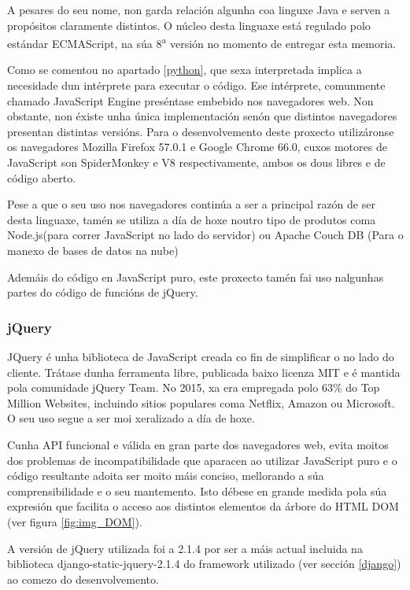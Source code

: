 A pesares do seu nome, non garda relación algunha coa linguxe Java e serven a propósitos claramente distintos. O núcleo desta linguaxe está regulado polo estándar ECMAScript\textregistered, na súa 8\textsuperscript{a} versión\cite{ecma} no momento de entregar esta memoria. 

Como se comentou no apartado \ref{python}, que sexa interpretada implica a necesidade dun intérprete para executar o código. Ese intérprete, comunmente chamado JavaScript Engine preséntase embebido nos navegadores web. Non obstante, non éxiste unha única implementación senón que distintos navegadores presentan distintas versións. Para o desenvolvemento deste proxecto utilizáronse os navegadores Mozilla Firefox 57.0.1 e Google Chrome 66.0, cuxos motores de JavaScript son SpiderMonkey e V8 respectivamente\cite{javascript1}, ambos os dous libres e de código aberto.

Pese a que o seu uso nos navegadores continúa a ser a principal razón de ser desta linguaxe, tamén se utiliza a día de hoxe noutro tipo de produtos coma Node.js(para correr JavaScript no lado do servidor) ou Apache Couch DB (Para o manexo de bases de datos na nube)\cite{javascript2} 

Ademáis do código en JavaScript puro, este proxecto tamén fai uso nalgunhas partes do código de funcións de jQuery.

\subsubsection{jQuery}

JQuery é unha biblioteca de JavaScript creada co fin de simplificar o  no lado do cliente. Trátase dunha ferramenta libre, publicada baixo licenza MIT e é mantida pola comunidade jQuery Team. No 2015, xa era empregada polo 63\% do Top Million Websites\cite{jquery}, incluindo sitios populares coma Netflix, Amazon ou Microsoft. O seu uso segue a ser moi xeralizado a día de hoxe.  

Cunha API funcional e válida en gran parte dos navegadores web, evita moitos dos problemas de incompatibilidade que aparacen ao utilizar JavaScript puro e o código resultante adoita ser moito máis conciso, mellorando a súa comprensibilidade e o seu mantemento. Isto débese en grande medida pola súa expresión  que facilita o acceso aos distintos elementos da árbore do HTML DOM (ver figura \ref{fig:img_DOM}). 

A versión de jQuery utilizada foi a 2.1.4 por ser a máis actual incluida na biblioteca django-static-jquery-2.1.4\cite{dj-jquery} do framework utilizado (ver sección \ref{django}) ao comezo do desenvolvemento.



